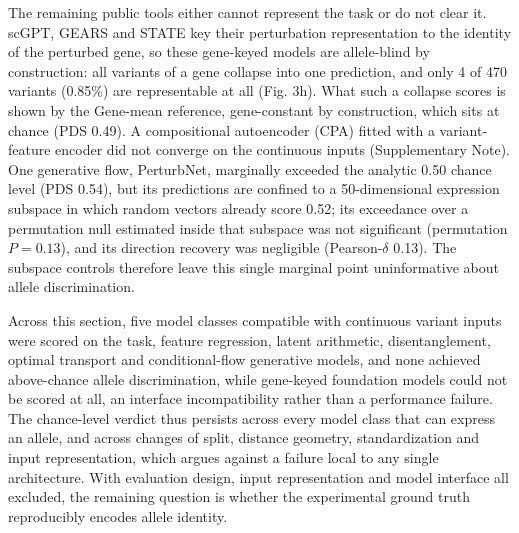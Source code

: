 \documentclass[11pt,letterpaper]{article}
\begin{document}
The remaining public tools either cannot represent the task or do not clear it. scGPT, GEARS and STATE key their perturbation representation to the identity of the perturbed gene, so these gene-keyed models are allele-blind by construction: all variants of a gene collapse into one prediction, and only 4 of 470 variants (0.85\%) are representable at all (Fig. 3h). What such a collapse scores is shown by the Gene-mean reference, gene-constant by construction, which sits at chance (PDS 0.49). A compositional autoencoder (CPA) fitted with a variant-feature encoder did not converge on the continuous inputs (Supplementary Note). One generative flow, PerturbNet, marginally exceeded the analytic 0.50 chance level (PDS 0.54), but its predictions are confined to a 50-dimensional expression subspace in which random vectors already score 0.52; its exceedance over a permutation null estimated inside that subspace was not significant (permutation $P=0.13$), and its direction recovery was negligible (Pearson-$\delta$ 0.13). The subspace controls therefore leave this single marginal point uninformative about allele discrimination.

Across this section, five model classes compatible with continuous variant inputs were scored on the task, feature regression, latent arithmetic, disentanglement, optimal transport and conditional-flow generative models, and none achieved above-chance allele discrimination, while gene-keyed foundation models could not be scored at all, an interface incompatibility rather than a performance failure. The chance-level verdict thus persists across every model class that can express an allele, and across changes of split, distance geometry, standardization and input representation, which argues against a failure local to any single architecture. With evaluation design, input representation and model interface all excluded, the remaining question is whether the experimental ground truth reproducibly encodes allele identity.
\end{document}
